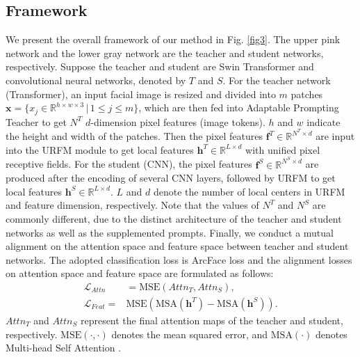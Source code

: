 \documentclass[sigconf]{acmart}
\begin{document}
\subsection{Framework}
We present the overall framework of our method in Fig. \ref{fig3}. The upper pink network and the lower gray network are the teacher and student networks, respectively. Suppose the teacher and student are Swin Transformer and convolutional neural networks, denoted by $T$ and $S$. For the teacher network (Transformer), an input facial image is resized and divided into $m$ patches $\mathbf{x}=\{x_j\in \mathbb{R}^{h\times w\times 3}\, |\,1\le j\le m\}$, which are then fed into Adaptable Prompting Teacher to get $N^T$ $d$-dimension pixel features (image tokens). $h$ and $w$ indicate the height and width of the patches. Then the pixel features $\bm{f}^T\in\mathbb{R}^{N^T\times d}$ are input into the URFM module to get local features $\bm{h}^T\in\mathbb{R}^{L\times d}$ with unified pixel receptive fields. For the student (CNN), the pixel features $\bm{f}^S\in\mathbb{R}^{N^S\times d}$ are produced after the encoding of several CNN layers, followed by URFM to get local features $\bm{h}^S  \in \mathbb{R}^{L\times d}$. $L$ and $d$ denote the number of local centers in URFM and feature dimension, respectively. Note that the values of $N^T$ and $N^S$ are commonly different, due to the distinct architecture of the teacher and student networks as well as the supplemented prompts. Finally, we conduct a mutual alignment on the attention space and feature space between teacher and student networks. The adopted classification loss is ArcFace loss \cite{arcface} and the alignment losses on attention space and feature space are formulated as follows:
\begin{equation}
\begin{aligned}
\mathcal{L}_{Attn} &= \mbox{MSE}(Attn_T, Attn_S) ,\\
\mathcal{L}_{Feat} = &\mbox{MSE}(\mbox{MSA}(\bm{h}^T)-\mbox{MSA}(\bm{h}^S)).
\end{aligned}
\end{equation}
$Attn_T$ and $Attn_S$ represent the final attention maps of the teacher and student, respectively. $\mbox{MSE}(\cdot,\cdot)$ denotes the mean squared error, and $\mbox{MSA}(\cdot)$ denotes Multi-head Self Attention \cite{msa}.
\end{document}
